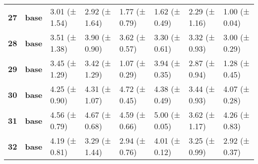 \begin{longtable}{llllllll}
\cline{1-8}
\textbf{27} & \textbf{base} & 3.01 (± 1.54) & 2.92 (± 1.64) & 1.77 (± 0.79) & 1.62 (± 0.49) & 2.29 (± 1.16) & 1.00 (± 0.04) \\
\cline{1-8}
\textbf{28} & \textbf{base} & 3.51 (± 1.38) & 3.90 (± 0.90) & 3.62 (± 0.57) & 3.30 (± 0.61) & 3.32 (± 0.93) & 3.00 (± 0.29) \\
\cline{1-8}
\textbf{29} & \textbf{base} & 3.45 (± 1.29) & 3.42 (± 1.29) & 1.07 (± 0.29) & 3.94 (± 0.35) & 2.87 (± 0.94) & 1.28 (± 0.45) \\
\cline{1-8}
\textbf{30} & \textbf{base} & 4.25 (± 0.90) & 4.31 (± 1.07) & 4.72 (± 0.45) & 4.38 (± 0.49) & 3.44 (± 0.93) & 4.07 (± 0.28) \\
\cline{1-8}
\textbf{31} & \textbf{base} & 4.56 (± 0.79) & 4.67 (± 0.68) & 4.59 (± 0.66) & 5.00 (± 0.05) & 3.62 (± 1.17) & 4.26 (± 0.83) \\
\cline{1-8}
\textbf{32} & \textbf{base} & 4.19 (± 0.81) & 3.29 (± 1.44) & 2.94 (± 0.76) & 4.01 (± 0.12) & 3.25 (± 0.99) & 2.92 (± 0.37) \\
\cline{1-8}
\end{longtable}
